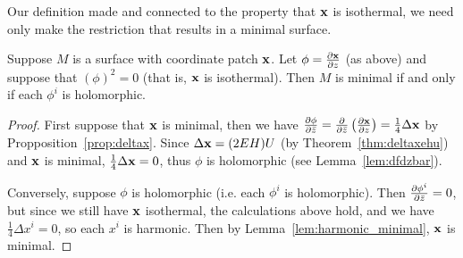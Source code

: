   Our definition made and connected to the property that $\mathbf{x}$ is isothermal, we need only make the restriction that results in a minimal surface.

  \begin{thm}
    Suppose $M$ is a surface with coordinate patch $\mathbf{x}$. Let $\phi = \frac{\partial\mathbf{x}}{\partial z}$ (as above) and suppose that $(\phi)^2 = 0$ (that is, $\mathbf{x}$ is isothermal). Then $M$ is minimal if and only if each $\phi^i$ is holomorphic.
  \end{thm}
  \begin{proof}
    First suppose that $\mathbf{x}$ is minimal, then we have $\frac{\partial\phi}{\partial\bar{z}} = \frac{\partial}{\partial\bar{z}}\left(\frac{\partial\mathbf{x}}{\partial z}\right) = \frac{1}{4}\Delta\mathbf{x}$ by Propposition~\ref{prop:deltax}. Since $\Delta\mathbf{x} = (2EH)U$ (by Theorem~\ref{thm:deltaxehu}) and $\mathbf{x}$ is minimal, $\frac{1}{4}\Delta\mathbf{x} = 0$, thus $\phi$ is holomorphic (see Lemma~\ref{lem:dfdzbar}).

    Conversely, suppose $\phi$ is holomorphic (i.e. each $\phi^i$ is holomorphic). Then $\frac{\partial\phi^i}{\partial\bar{z}} = 0$, but since we still have $\mathbf{x}$ isothermal, the calculations above hold, and we have $\frac{1}{4}\Delta x^i = 0$, so each $x^i$ is harmonic. Then by Lemma~\ref{lem:harmonic_minimal}, $\mathbf{x}$ is minimal. 
  \end{proof}

